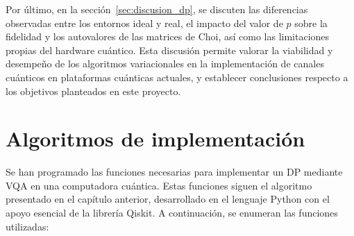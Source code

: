 \documentclass[letterpaper,12pt]{thesisECFM}
\theoremstyle{plain}
\theoremstyle{definition}
\theoremstyle{definition}
\theoremstyle{remark}
\newcommand{\1}{\mathbb{1}}
\begin{document}
Por último, en la sección~\ref{sec:discusion_dp}, se discuten las diferencias
observadas entre los entornos ideal y real, el impacto del valor de $p$ sobre
la fidelidad y los autovalores de las matrices de Choi, así como las
limitaciones propias del hardware cuántico. Esta discusión permite valorar la
viabilidad y desempeño de los algoritmos variacionales en la implementación de
canales cuánticos en plataformas cuánticas actuales, y establecer conclusiones
respecto a los objetivos planteados en este proyecto.



\section{Algoritmos de implementación} %
\label{sec:algoritmos_vqa}
Se han programado las funciones necesarias para implementar un DP mediante VQA
en una computadora cuántica. Estas funciones siguen el algoritmo presentado en
el capítulo anterior, desarrollado en el lenguaje Python con el apoyo esencial
de la librería Qiskit. A continuación, se enumeran las funciones utilizadas: 
\end{document}
